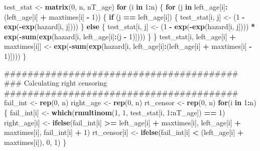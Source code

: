 \documentclass[11pt,]{article}
\newenvironment{Shaded}{\begin{snugshade}}{\end{snugshade}}
\newcommand{\KeywordTok}[1]{\textcolor[rgb]{0.13,0.29,0.53}{\textbf{#1}}}
\newcommand{\DecValTok}[1]{\textcolor[rgb]{0.00,0.00,0.81}{#1}}
\newcommand{\StringTok}[1]{\textcolor[rgb]{0.31,0.60,0.02}{#1}}
\newcommand{\ControlFlowTok}[1]{\textcolor[rgb]{0.13,0.29,0.53}{\textbf{#1}}}
\newcommand{\OperatorTok}[1]{\textcolor[rgb]{0.81,0.36,0.00}{\textbf{#1}}}
\newcommand{\NormalTok}[1]{#1}
\begin{document}
\begin{Shaded}
\begin{Highlighting}[]
\NormalTok{  test_stat <-}\StringTok{ }\KeywordTok{matrix}\NormalTok{(}\DecValTok{0}\NormalTok{, n, nT_age)}
  \ControlFlowTok{for}\NormalTok{ (i }\ControlFlowTok{in} \DecValTok{1}\OperatorTok{:}\NormalTok{n) \{}
    \ControlFlowTok{for}\NormalTok{ (j }\ControlFlowTok{in}\NormalTok{ left_age[i]}\OperatorTok{:}\NormalTok{(left_age[i] }\OperatorTok{+}\StringTok{ }\NormalTok{maxtimes[i] }\OperatorTok{-}\StringTok{ }\DecValTok{1}\NormalTok{)) \{}
      \ControlFlowTok{if}\NormalTok{ (j }\OperatorTok{==}\StringTok{ }\NormalTok{left_age[i]) \{}
\NormalTok{        test_stat[i, j] <-}\StringTok{ }\NormalTok{(}\DecValTok{1} \OperatorTok{-}\StringTok{ }\KeywordTok{exp}\NormalTok{(}\OperatorTok{-}\KeywordTok{exp}\NormalTok{(hazard[i, j])))}
\NormalTok{      \} }\ControlFlowTok{else}\NormalTok{ \{}
\NormalTok{        test_stat[i, j] <-}
\StringTok{           }\NormalTok{(}\DecValTok{1} \OperatorTok{-}\StringTok{ }\KeywordTok{exp}\NormalTok{(}\OperatorTok{-}\KeywordTok{exp}\NormalTok{(hazard[i, j]))) }\OperatorTok{*}
\StringTok{           }\KeywordTok{exp}\NormalTok{(}\OperatorTok{-}\KeywordTok{sum}\NormalTok{(}\KeywordTok{exp}\NormalTok{(hazard[i, left_age[i]}\OperatorTok{:}\NormalTok{(j }\OperatorTok{-}\StringTok{ }\DecValTok{1}\NormalTok{)])))}
\NormalTok{      \}}
\NormalTok{    \}}
\NormalTok{    test_stat[i, left_age[i] }\OperatorTok{+}\StringTok{ }\NormalTok{maxtimes[i]] <-}
\StringTok{            }\KeywordTok{exp}\NormalTok{(}\OperatorTok{-}\KeywordTok{sum}\NormalTok{(}\KeywordTok{exp}\NormalTok{(hazard[i, left_age[i]}\OperatorTok{:}\NormalTok{(left_age[i]}
            \OperatorTok{+}\StringTok{ }\NormalTok{maxtimes[i] }\OperatorTok{-}\StringTok{ }\DecValTok{1}\NormalTok{)])))}
\NormalTok{  \}}

\NormalTok{  ########################################}
\NormalTok{  ### Calculating right censoring}
\NormalTok{  ########################################}
\NormalTok{  fail_int <-}\StringTok{ }\KeywordTok{rep}\NormalTok{(}\DecValTok{0}\NormalTok{, n)}
\NormalTok{  right_age <-}\StringTok{ }\KeywordTok{rep}\NormalTok{(}\DecValTok{0}\NormalTok{, n)}
\NormalTok{  rt_censor <-}\StringTok{ }\KeywordTok{rep}\NormalTok{(}\DecValTok{0}\NormalTok{, n)}
  \ControlFlowTok{for}\NormalTok{(i }\ControlFlowTok{in} \DecValTok{1}\OperatorTok{:}\NormalTok{n)\{}
\NormalTok{    fail_int[i] <-}\StringTok{ }\KeywordTok{which}\NormalTok{(}\KeywordTok{rmultinom}\NormalTok{(}\DecValTok{1}\NormalTok{, }\DecValTok{1}\NormalTok{, test_stat[i, }\DecValTok{1}\OperatorTok{:}\NormalTok{nT_age]) }\OperatorTok{==}\StringTok{ }\DecValTok{1}\NormalTok{)}
\NormalTok{    right_age[i] <-}\StringTok{ }\KeywordTok{ifelse}\NormalTok{(fail_int[i] }\OperatorTok{>=}\StringTok{ }\NormalTok{left_age[i] }\OperatorTok{+}\StringTok{ }\NormalTok{maxtimes[i],}
\NormalTok{                          left_age[i] }\OperatorTok{+}\StringTok{ }\NormalTok{maxtimes[i],}
\NormalTok{                          fail_int[i] }\OperatorTok{+}\StringTok{ }\DecValTok{1}\NormalTok{)}
\NormalTok{    rt_censor[i] <-}\StringTok{ }\KeywordTok{ifelse}\NormalTok{(fail_int[i] }\OperatorTok{<}\StringTok{ }\NormalTok{(left_age[i] }\OperatorTok{+}\StringTok{ }\NormalTok{maxtimes[i]), }\DecValTok{0}\NormalTok{, }\DecValTok{1}\NormalTok{)}
\NormalTok{  \}}


\end{Highlighting}
\end{Shaded}
\end{document}
